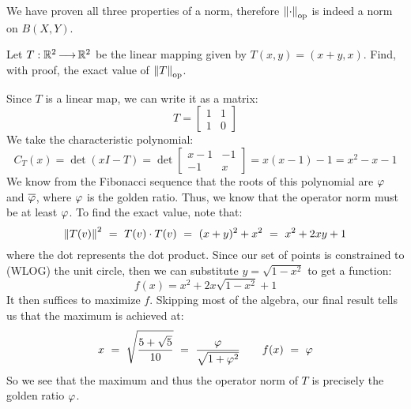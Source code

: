 \begin{soln}
    We have proven all three properties of a norm, therefore
    $ \left\|\cdot\right\|_{\textrm{op}} $ is indeed a norm on $ B(X, Y) $.
\end{soln}

\begin{qu}[num=6.3]
    Let $ T: \mathbb{R}^{2} \operatorname{\longrightarrow} \mathbb{R}^{2} $ be the linear mapping given by
    $ T(x, y) = (x + y, x) $. Find, with proof, the exact value of
    $ \left\|T\right\|_{\textrm{op}} $.
\end{qu}

\begin{soln}
    Since $ T $ is a linear map, we can write it as a matrix:
    \begin{equation*}
        T =
        \begin{bmatrix}
            1 & 1 \\ 1 & 0
        \end{bmatrix}
    \end{equation*}
    We take the characteristic polynomial:
    \begin{equation*}
        C_{T}(x) = \det(xI - T) =
        \det\begin{bmatrix}
            x-1 & -1 \\ -1 & x
        \end{bmatrix}
        = x(x - 1) - 1 = x^{2} - x - 1
    \end{equation*}
    We know from the Fibonacci sequence that the roots of this polynomial are
    $ \operatorname{\varphi} $ and $ \overline{\operatorname{\varphi}} $, where $ \operatorname{\varphi} $ is the golden ratio.
    Thus, we know that the operator norm must be at least $ \operatorname{\varphi} $. \vsp
    To find the exact value, note that:
    \begin{equation*}
        \norm{T(v)}^{2} \ = \ T(v)\cdot T(v) \ = \ (x+y)^{2}+x^{2} \ = \
        x^{2}+2xy+1
    \end{equation*}
    where the dot represents the dot product. Since our set of points is
    constrained to (WLOG) the unit circle, then we can substitute
    $ y=\sqrt{1-x^{2}} $ to get a function:
    \begin{equation*}
        f(x) = x^{2}+2x\sqrt{1-x^{2}}+1
    \end{equation*}
    It then suffices to maximize $ f $. Skipping most of the algebra, our final
    result tells us that the maximum is achieved at:
    \begin{equation*}
        x \ = \ \sqrt{\frac{5+\sqrt{5}}{10}} \ = \
        \frac{\vphi}{\sqrt{1+\vphi^{2}}} \qquad
        f(x) \ = \ \vphi
    \end{equation*}
    So we see that the maximum and thus the operator norm of $ T $ is precisely
    the golden ratio $ \operatorname{\varphi} $.
\end{soln}

